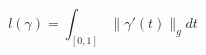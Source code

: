 \documentclass[preview]{standalone}
\begin{document}
\begin{center}
\[l(\gamma) = \int_{[0,1]} \lVert \gamma'(t)\rVert_g dt\]
\end{center}
\end{document}
